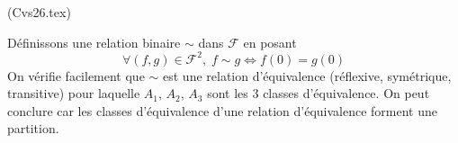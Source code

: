 \begin{tiny}(Cvs26.tex)\end{tiny}
Définissons une relation binaire $\sim$ dans $\mathcal{F}$ en posant
\begin{displaymath}
  \forall (f,g) \in \mathcal{F}^2, \; f \sim  g \Leftrightarrow f(0) = g(0)
\end{displaymath}
On vérifie facilement que $\sim$ est une relation d'équivalence (réflexive, symétrique, transitive) pour laquelle $A_1$, $A_2$, $A_3$ sont les 3 classes d'équivalence.\newline
On peut conclure car les classes d'équivalence d'une relation d'équivalence forment une partition.
